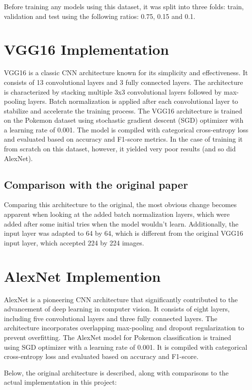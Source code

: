 \documentclass{article}
\begin{document}
Before training any models using this dataset, it was split into three folds: train, validation and test using the following ratios: 0.75, 0.15 and 0.1.

\section{VGG16 Implementation}
VGG16 is a classic CNN architecture known for its simplicity and effectiveness. It consists of 13 convolutional layers and 3 fully connected layers. The architecture is characterized by stacking multiple 3x3 convolutional layers followed by max-pooling layers. Batch normalization is applied after each convolutional layer to stabilize and accelerate the training process. The VGG16 architecture is trained on the Pokemon dataset using stochastic gradient descent (SGD) optimizer with a learning rate of 0.001. The model is compiled with categorical cross-entropy loss and evaluated based on accuracy and F1-score metrics. In the case of training it from scratch on this dataset, however, it yielded very poor results (and so did AlexNet).

\subsection{Comparison with the original paper}
Comparing this architecture to the original\cite{vgg16}, the most obvious change becomes apparent when looking at the added batch normalization layers, which were added after some initial tries when the model wouldn't learn. Additionally, the input layer was adapted to 64 by 64, which is different from the original VGG16 input layer, which accepted 224 by 224 images.

\section{AlexNet Implemention}
AlexNet\cite{alexnet} is a pioneering CNN architecture that significantly contributed to the advancement of deep learning in computer vision. It consists of eight layers, including five convolutional layers and three fully connected layers. The architecture incorporates overlapping max-pooling and dropout regularization to prevent overfitting. The AlexNet model for Pokemon classification is trained using SGD optimizer with a learning rate of 0.001. It is compiled with categorical cross-entropy loss and evaluated based on accuracy and F1-score.

Below, the original architecture is described, along with comparisons to the actual implementation in this project:
\end{document}
